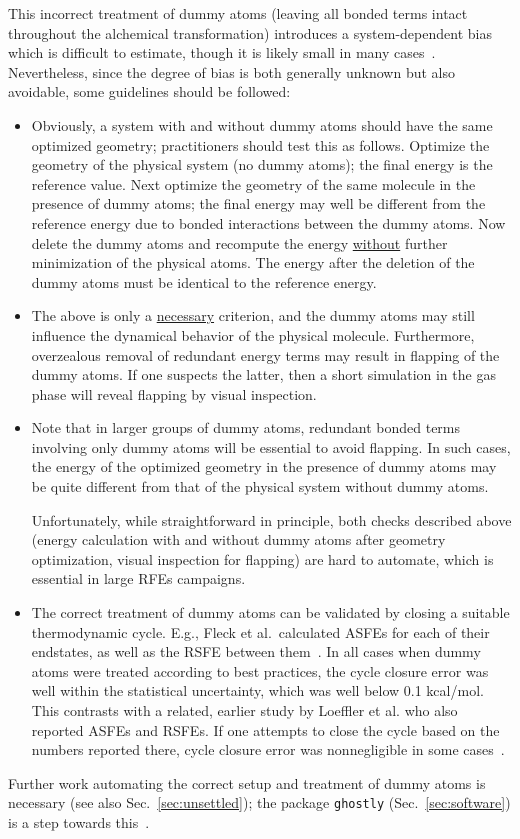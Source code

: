 \documentclass[9pt,bestpractices]{livecoms}
\begin{document}
This incorrect treatment of dummy atoms (leaving all bonded terms intact throughout the alchemical transformation) introduces a system-dependent bias which is difficult to estimate, though it is likely small in many cases~\cite{Fleck_2021}. Nevertheless, since the degree of bias is both generally unknown but also avoidable, some guidelines should be followed:
\begin{itemize}
  \item Obviously, a system with and without dummy atoms should have the same optimized geometry; practitioners should test this as follows. Optimize the geometry of the physical system (no dummy atoms); the final energy is the reference value. Next optimize the geometry of the same molecule in the presence of dummy atoms; the final energy may well be different from the reference energy due to bonded interactions between the dummy atoms. Now delete the dummy atoms and recompute the energy \underline{without} further minimization of the physical atoms. The energy after the deletion of the dummy atoms must be identical to the reference energy. 
  \item The above is only a \underline{necessary} criterion, and the dummy atoms may still influence the dynamical behavior of the physical molecule. Furthermore, overzealous removal of redundant energy terms may result in flapping of the dummy atoms. If one suspects the latter, then a short simulation in the gas phase will reveal flapping by visual inspection. 
  \item   Note that in larger groups of dummy atoms, redundant bonded terms involving only dummy atoms will be essential to avoid flapping. In such cases, the energy of the optimized geometry in the presence of dummy atoms may be quite different from that of the physical system without dummy atoms. 

  Unfortunately, while straightforward in principle, both checks described above (energy calculation with and without dummy atoms after geometry optimization, visual inspection for flapping) are hard to automate, which is essential in large RFEs campaigns.
  \item The correct treatment of dummy atoms can be validated by closing a suitable thermodynamic cycle.  E.g., Fleck et al.\ calculated ASFEs for each of their endstates, as well as the RSFE between them~\cite{Fleck_2021}. In all cases when dummy atoms were treated according to best practices, the cycle closure error was well within the statistical uncertainty, which was well below 0.1 kcal/mol. This contrasts with a related, earlier study by Loeffler et al. who also reported ASFEs and RSFEs. If one attempts to close the cycle based on the numbers reported there, cycle closure error was nonnegligible in some cases~\cite{loeffler2018reproducibility}. 

  \end{itemize}
%
Further work automating the correct setup and treatment of dummy atoms is necessary (see also Sec.~\ref{sec:unsettled}); the package \texttt{ghostly} (Sec.~\ref{sec:software}) is a step towards this~\cite{hedges_ghostly_2025.2.0}.
\end{document}
